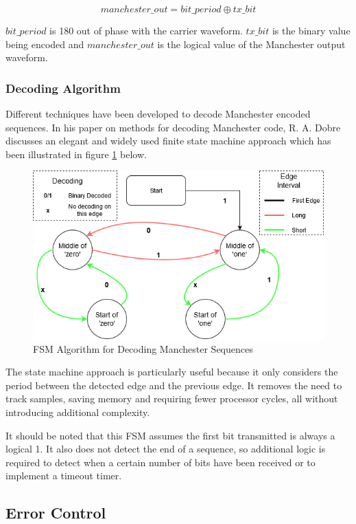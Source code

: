 \begin{equation}
\label{eqn:manchesterencode}
manchester\_out = bit\_period \oplus tx\_bit
\end{equation}

$bit\_period$ is 180\textdegree{} out of phase with the carrier waveform. $tx\_bit$ is the binary value being encoded and $manchester\_out$ is the logical value of the Manchester output waveform.


\subsubsection{Decoding Algorithm}
Different techniques have been developed to decode Manchester encoded sequences. In his paper on methods for decoding Manchester code, R. A. Dobre discusses an elegant and widely used finite state machine approach which has been illustrated in figure \ref{fig:manchesterdecodingfsm} below. \cite{Dobre2014}

\begin{figure}[H]
	\centering
	\includegraphics[width=0.7\linewidth]{figures/litreview/manchester_decoding_fsm.png}
	\caption{FSM Algorithm for Decoding Manchester Sequences}
	\label{fig:manchesterdecodingfsm}
\end{figure}

The state machine approach is particularly useful because it only considers the period between the detected edge and the previous edge. It removes the need to track samples, saving memory and requiring fewer processor cycles, all without introducing additional complexity.

It should be noted that this FSM assumes the first bit transmitted is always a logical 1. It also does not detect the end of a sequence, so additional logic is required to detect when a certain number of bits have been received or to implement a timeout timer.

\subsection{Error Control}

